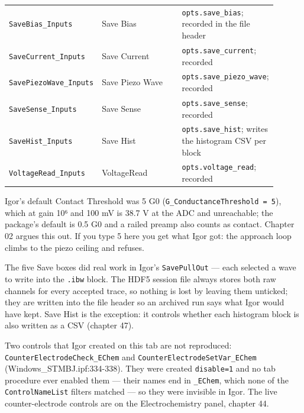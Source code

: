 \begin{longtable}{@{}>{\raggedright\arraybackslash}p{0.26\linewidth}>{\raggedright\arraybackslash}p{0.30\linewidth}>{\raggedright\arraybackslash}p{0.34\linewidth}@{}}
\texttt{Save\discretionary{}{}{}Bias\_\discretionary{}{}{}Inputs} & Save Bias & \texttt{opts.\discretionary{}{}{}save\_\discretionary{}{}{}bias}; recorded in the file header \\
\texttt{Save\discretionary{}{}{}Current\_\discretionary{}{}{}Inputs} & Save Current & \texttt{opts.\discretionary{}{}{}save\_\discretionary{}{}{}current}; recorded \\
\texttt{Save\discretionary{}{}{}Piezo\discretionary{}{}{}Wave\_\discretionary{}{}{}Inputs} & Save Piezo Wave & \texttt{opts.\discretionary{}{}{}save\_\discretionary{}{}{}piezo\_\discretionary{}{}{}wave}; recorded \\
\texttt{Save\discretionary{}{}{}Sense\_\discretionary{}{}{}Inputs} & Save Sense & \texttt{opts.\discretionary{}{}{}save\_\discretionary{}{}{}sense}; recorded \\
\texttt{Save\discretionary{}{}{}Hist\_\discretionary{}{}{}Inputs} & Save Hist & \texttt{opts.\discretionary{}{}{}save\_\discretionary{}{}{}hist}; writes the histogram CSV per block \\
\texttt{Voltage\discretionary{}{}{}Read\_\discretionary{}{}{}Inputs} & VoltageRead & \texttt{opts.\discretionary{}{}{}voltage\_\discretionary{}{}{}read}; recorded \\
\bottomrule
\end{longtable}
\normalsize

Igor's default Contact Threshold was 5 G0 (\texttt{G\_\discretionary{}{}{}Conductance\discretionary{}{}{}Threshold = 5}), which at gain 10⁶ and 100 mV is 38.7 V at the ADC and unreachable; the package's default is 0.5 G0 and a railed preamp also counts as contact. Chapter 02 argues this out. If you type 5 here you get what Igor got: the approach loop climbs to the piezo ceiling and refuses.

The five Save boxes did real work in Igor's \texttt{Save\discretionary{}{}{}Pull\discretionary{}{}{}Out} --- each selected a wave to write into the \texttt{.\discretionary{}{}{}ibw} block. The HDF5 session file always stores both raw channels for every accepted trace, so nothing is lost by leaving them unticked; they are written into the file header so an archived run says what Igor would have kept. Save Hist is the exception: it controls whether each histogram block is also written as a CSV (chapter 47).

Two controls that Igor created on this tab are not reproduced: \texttt{Counter\discretionary{}{}{}Electrode\discretionary{}{}{}Check\_\discretionary{}{}{}EChem} and \texttt{Counter\discretionary{}{}{}Electrode\discretionary{}{}{}Set\discretionary{}{}{}Var\_\discretionary{}{}{}EChem} (Windows\_STMBJ.ipf:334-338). They were created \texttt{disable=1} and no tab procedure ever enabled them --- their names end in \texttt{\_\discretionary{}{}{}EChem}, which none of the \texttt{Control\discretionary{}{}{}Name\discretionary{}{}{}List} filters matched --- so they were invisible in Igor. The live counter-electrode controls are on the Electrochemistry panel, chapter 44.

